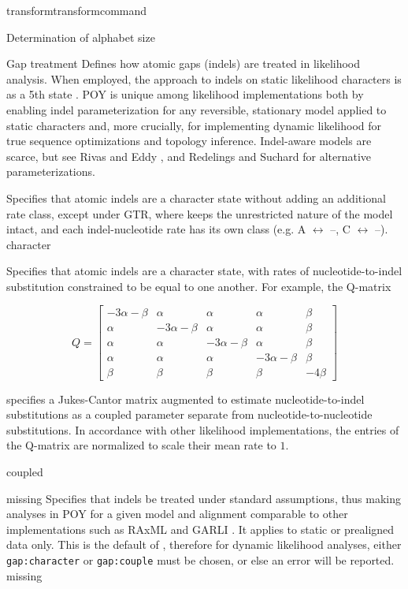 \begin{command}{transform}{transformcommand}
\begin{arguments}
\begin{argumentgroup}{Determination of alphabet size}
\end{argumentgroup}

\begin {argumentgroup} {Gap treatment}
Defines how atomic gaps (indels) are treated in
likelihood analysis. When employed, the \poy approach to
indels on static likelihood characters is as a 5th state 
\cite{mcguire2001models,Wheeler2006}. 
POY is unique among likelihood implementations both
by enabling indel parameterization for any reversible,
stationary model applied to static characters and, more
crucially, for implementing dynamic likelihood for true
sequence optimizations and topology inference. Indel-aware
models are scarce, but see Rivas and Eddy \cite{rivas2008probabilistic}, 
and Redelings and Suchard \cite{redelings2005joint,redelings2007incorporating}
for alternative parameterizations.

{Specifies that atomic indels are a character state
without adding an additional rate class, except
under GTR, where \poy keeps the unrestricted nature of the
model intact, and each indel-nucleotide rate has its
own class (e.g. A $\leftrightarrow$ --, C $\leftrightarrow$ --).}
{character}

{Specifies that atomic indels are a character state,
with rates of nucleotide-to-indel substitution
constrained to be equal to one another. For example,
the Q-matrix

\begin{equation*}
Q =
\begin{bmatrix}
-3 \alpha - \beta & \alpha & \alpha & \alpha & \beta \\
\alpha & -3 \alpha - \beta & \alpha & \alpha & \beta \\
\alpha & \alpha & -3 \alpha - \beta & \alpha & \beta \\
\alpha & \alpha & \alpha & -3 \alpha - \beta & \beta \\
\beta & \beta & \beta & \beta & -4 \beta
\end{bmatrix}
\end{equation*}

specifies a Jukes-Cantor matrix augmented to
estimate nucleotide-to-indel substitutions as a
coupled parameter separate from
nucleotide-to-nucleotide substitutions. In
accordance with other likelihood implementations,
the entries of the Q-matrix are normalized
to scale their mean rate to $ 1 $.}
{coupled}

 {\obligatory missing}
{Specifies that indels be treated under standard
assumptions, thus making analyses in POY for a given
model and alignment comparable to other
implementations such as RAxML \cite{stamatakis2006} and 
GARLI \cite{zwickl2006}. It applies to static
or prealigned data only. This is the default of \poy, therefore for dynamic
likelihood analyses, either \texttt{gap:character} or \texttt{gap:couple}
must be chosen, or else an error will be reported.}
{missing}


\end{argumentgroup}
\end{arguments}
\end{command}
